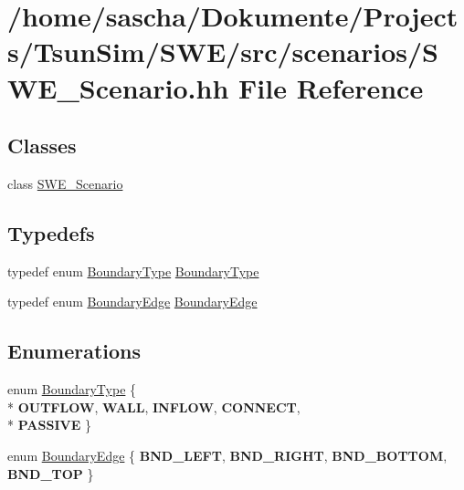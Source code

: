 \hypertarget{SWE__Scenario_8hh}{\section{/home/sascha/\-Dokumente/\-Projects/\-Tsun\-Sim/\-S\-W\-E/src/scenarios/\-S\-W\-E\-\_\-\-Scenario.hh File Reference}
\label{SWE__Scenario_8hh}
}
\subsection*{Classes}
\begin{DoxyCompactItemize}
\item 
class \hyperlink{classSWE__Scenario}{S\-W\-E\-\_\-\-Scenario}
\end{DoxyCompactItemize}
\subsection*{Typedefs}
\begin{DoxyCompactItemize}
\item 
typedef enum \hyperlink{SWE__Scenario_8hh_af75d5dd7322fa39ed0af4e7839e600f8}{Boundary\-Type} \hyperlink{SWE__Scenario_8hh_a0076a482278ddc13ed179c6c76c9b5ad}{Boundary\-Type}
\item 
typedef enum \hyperlink{SWE__Scenario_8hh_aa5e01e3f7df312f7b9b0d02521141fcc}{Boundary\-Edge} \hyperlink{SWE__Scenario_8hh_a53b43e70a19e542b4c1ab2da9c6bcc0e}{Boundary\-Edge}
\end{DoxyCompactItemize}
\subsection*{Enumerations}
\begin{DoxyCompactItemize}
\item 
enum \hyperlink{SWE__Scenario_8hh_af75d5dd7322fa39ed0af4e7839e600f8}{Boundary\-Type} \{ \\*
{\bfseries O\-U\-T\-F\-L\-O\-W}, 
{\bfseries W\-A\-L\-L}, 
{\bfseries I\-N\-F\-L\-O\-W}, 
{\bfseries C\-O\-N\-N\-E\-C\-T}, 
\\*
{\bfseries P\-A\-S\-S\-I\-V\-E}
 \}
\item 
enum \hyperlink{SWE__Scenario_8hh_aa5e01e3f7df312f7b9b0d02521141fcc}{Boundary\-Edge} \{ {\bfseries B\-N\-D\-\_\-\-L\-E\-F\-T}, 
{\bfseries B\-N\-D\-\_\-\-R\-I\-G\-H\-T}, 
{\bfseries B\-N\-D\-\_\-\-B\-O\-T\-T\-O\-M}, 
{\bfseries B\-N\-D\-\_\-\-T\-O\-P}
 \}
\end{DoxyCompactItemize}


